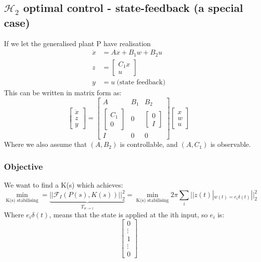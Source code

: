 \documentclass{article}
\begin{document}
\subsection{\texorpdfstring{$\mathcal{H}_2$}. optimal control - state-feedback (a special case)}
If we let the generalised plant P have realisation
\[
\begin{aligned}
    \dot x &= Ax + B_1 w + B_2 u \\
    z &= \begin{bmatrix}
        C_1 x \\ u
    \end{bmatrix} \\
    y &= u \; \text{(state feedback)}
\end{aligned}
\]
This can be written in matrix form as:
\[
\begin{bmatrix}
    \dot x \\ z \\ y 
\end{bmatrix}
= \begin{bmatrix}
    A & B_1 & B_2 \\ \begin{bmatrix}
        C_1 \\ 0
    \end{bmatrix}
    & 0 &
    \begin{bmatrix}
        0 \\ I
    \end{bmatrix} \\
    I & 0 & 0
\end{bmatrix}
\begin{bmatrix}
    x \\ w \\ u
\end{bmatrix}
\]
Where we also assume that $(A,B_2)$ is controllable, and $(A,C_1)$ is observable.
\subsubsection*{Objective}
We want to find a K(s) which achieves:
\[
\min_{\text{K(s) stabilising}} = \underbrace{||\mathcal{F}_I (P(s),K(s))||_2^2}_{T_{w \rightarrow z}} = \min_{\text{K(s) stabilising}} 2 \pi \sum_i || z(t)|_{w(t) = e_i \delta(t)}||_2^2
\]
Where $e_i \delta(t)$, means that the state is applied at the ith input, so $e_i$ is:
\[
\begin{bmatrix}
    0 \\ \vdots  \\ 1 \\ \vdots \\ 0
\end{bmatrix}
\]
\end{document}
